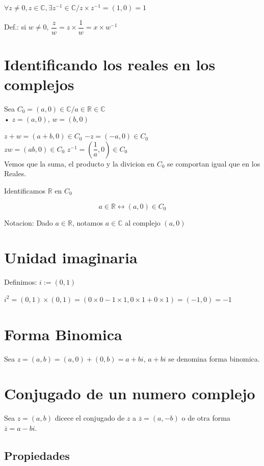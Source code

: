 $\forall z \neq 0, z\in \mathbb{C}, \exists z^{-1} \in \mathbb{C} / z\times z^{-1} = (1,0)=1$

Def.: si $w \neq 0$, $\dfrac{z}{w} = z \times \dfrac{1}{w} = x \times w^{-1}$


\section{Identificando los reales en los complejos}

Sea $C_0 = { (a,0) \in \mathbb{C} / a \in \mathbb{R}} \in \mathbb{C}$\\

• $z=(a,0)$, $w=(b,0)$

$z+w=(a+b,0) \in C_0$ \qquad $-z=(-a,0) \in C_0$ \\
$zw =(ab,0) \in C_0$ \qquad $z^{-1}=(\dfrac{1}{a},0) \in C_0$\\

Vemos que la suma, el producto y la divicion en $C_0$ se comportan igual que en los Reales.

Identificamos $\mathbb{R}$ en $C_0$

$$a \in \mathbb{R} \longleftrightarrow (a,0) \in C_0 $$

Notacion: Dado $ a \in \mathbb{R}$, notamos $a \in \mathbb{C}$ al complejo $(a,0)$

\section{Unidad imaginaria}

Definimos: $i := (0,1)$

$i^2 = (0,1) \times	(0,1) = (0 \times 0 - 1 \times 1, 0 \times 1 + 0 \times 1)= (-1,0) =-1$
\section{Forma Binomica}
Sea $z=(a,b)=(a,0)+(0,b)=a+bi$, $a+bi$ se denomina forma binomica.

\section{Conjugado de un numero complejo}

Sea $z=(a,b)$ dicece el conjugado de $z$ a  $\overline{z}=(a,-b)$ o de otra forma $\overline{z}=a-bi$.

\subsection{Propiedades}

